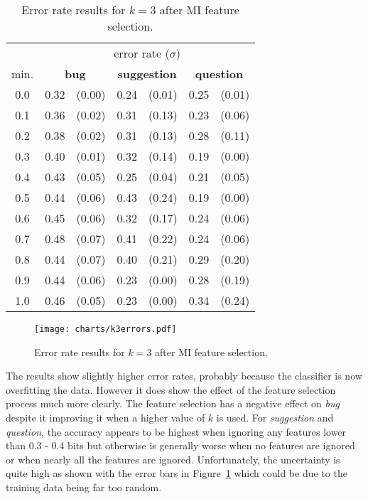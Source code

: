 \begin{table}[h]
    \centering
    \begin{tabular}{|c||cc|cc|cc|}
    \hline

    & \multicolumn{6}{c|}{error rate ($\sigma$)} \\

    min. &
    \multicolumn{2}{c|}{\textbf{bug}} &
    \multicolumn{2}{c|}{\textbf{suggestion}} &
    \multicolumn{2}{c|}{\textbf{question}}
    
    \\
    \hline

    0.0 & 0.32 & (0.00) & 0.24 & (0.01) & 0.25 & (0.01) \\
    0.1 & 0.36 & (0.02) & 0.31 & (0.13) & 0.23 & (0.06) \\
    0.2 & 0.38 & (0.02) & 0.31 & (0.13) & 0.28 & (0.11) \\
    0.3 & 0.40 & (0.01) & 0.32 & (0.14) & 0.19 & (0.00) \\
    0.4 & 0.43 & (0.05) & 0.25 & (0.04) & 0.21 & (0.05) \\
    0.5 & 0.44 & (0.06) & 0.43 & (0.24) & 0.19 & (0.00) \\
    0.6 & 0.45 & (0.06) & 0.32 & (0.17) & 0.24 & (0.06) \\
    0.7 & 0.48 & (0.07) & 0.41 & (0.22) & 0.24 & (0.06) \\
    0.8 & 0.44 & (0.07) & 0.40 & (0.21) & 0.29 & (0.20) \\
    0.9 & 0.44 & (0.06) & 0.23 & (0.00) & 0.28 & (0.19) \\
    1.0 & 0.46 & (0.05) & 0.23 & (0.00) & 0.34 & (0.24) \\

    \hline
    \end{tabular}
    \caption{Error rate results for $k = 3$ after MI feature selection.}
    \label{tbl:mi_errors_k3}
\end{table}

\begin{figure}[h]
    \centering
    \texttt{[image: charts/k3errors.pdf]}
    \caption{Error rate results for $k = 3$ after MI feature selection.}
    \label{fig:mi_errors_k3}
\end{figure}

The results show slightly higher error rates, probably because the classifier is now overfitting the data. However it does show
the effect of the feature selection process much more clearly. The feature selection has a negative effect on \textit{bug}
despite it improving it when a higher value of $k$ is used. For \textit{suggestion} and \textit{question}, the accuracy appears
to be highest when ignoring any features lower than 0.3 - 0.4 bits but otherwise is generally worse when no features are ignored
or when nearly all the features are ignored. Unfortunately, the uncertainty is quite high as shown with the error bars in
Figure~\ref{fig:mi_errors_k3} which could be due to the training data being far too random.

